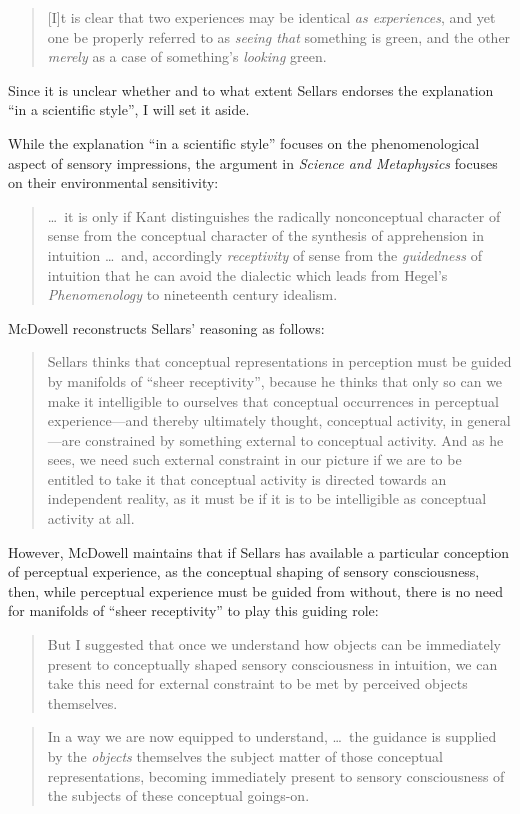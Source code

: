 \documentclass[12pt]{article}
\begin{document}
\begin{quote}
    [I]t is clear that two experiences may be identical \emph{as experiences}, and yet one be properly referred to as \emph{seeing that} something is green, and the other \emph{merely} as a case of something's \emph{looking} green. \citep[§16]{Sellars:1956xp}
\end{quote}
Since it is unclear whether and to what extent Sellars endorses the explanation ``in a scientific style'', I will set it aside.

While the explanation ``in a scientific style'' focuses on the phenomenological aspect of sensory impressions, the argument in \emph{Science and Metaphysics} focuses on their environmental sensitivity:
\begin{quote}
    \ldots\ it is only if Kant distinguishes the radically nonconceptual character of sense from the conceptual character of the synthesis of apprehension in intuition \ldots\ and, accordingly \emph{receptivity} of sense from the \emph{guidedness} of intuition that he can avoid the dialectic which leads from Hegel's \emph{Phenomenology} to nineteenth century idealism. \citep[16]{Sellars:1967uq}
\end{quote}
McDowell reconstructs Sellars' reasoning as follows:
\begin{quote}
    Sellars thinks that conceptual representations in perception must be guided by manifolds of ``sheer receptivity'', because he thinks that only so can we make it intelligible to ourselves that conceptual occurrences in perceptual experience---and thereby ultimately thought, conceptual activity, in general---are constrained by something external to conceptual activity. And as he sees, we need such external constraint in our picture if we are to be entitled to take it that conceptual activity is directed towards an independent reality, as it must be if it is to be intelligible as conceptual activity at all. \citep[46]{McDowell:1998vn}
\end{quote}

However, McDowell maintains that if Sellars has available a particular conception of perceptual experience, as the conceptual shaping of sensory consciousness, then, while perceptual experience must be guided from without, there is no need for manifolds of ``sheer receptivity'' to play this guiding role:
\begin{quote}
    But I suggested that once we understand how objects can be immediately present to conceptually shaped sensory consciousness in intuition, we can take this need for external constraint to be met by perceived objects themselves. \citep[46]{McDowell:1998vn}
\end{quote}
\begin{quote}
    In a way we are now equipped to understand, \ldots\ the guidance is supplied by the \emph{objects} themselves the subject matter of those conceptual representations, becoming immediately present to sensory consciousness of the subjects of these conceptual goings-on. \citep[467]{McDowell:1998vn}
\end{quote}
\end{document}
